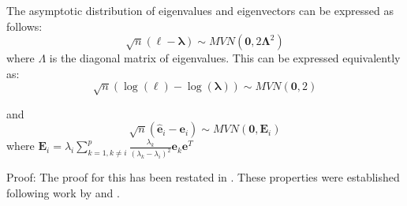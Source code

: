 \begin{theorem}
\label{th:pcasymptotics}
The asymptotic distribution of eigenvalues and eigenvectors can be expressed as follows:
\begin{equation}
\label{pcasymptotics}
\sqrt{n}(\boldsymbol{\ell} - \boldsymbol{\lambda}) \sim MVN(\boldsymbol{0}, 2\boldsymbol{\Lambda}^{2})
\end{equation}
where $\Lambda$ is the diagonal matrix of eigenvalues.   This can be expressed equivalently as:
\begin{equation}
\label{pcaasymptoticslog}
\sqrt{n}\left(\log(\boldsymbol{\ell}) - \log(\boldsymbol{\lambda})\right) \sim MVN(\boldsymbol{0}, 2)
\end{equation}

 and 
\begin{equation}
\sqrt{n}(\hat{\boldsymbol{e}}_{i} - \boldsymbol{e}_{i}) \sim MVN(\boldsymbol{0}, \boldsymbol{E}_{i})
\end{equation}
where $\boldsymbol{E}_{i} = \lambda_{i} \sum_{k = 1, k \neq i}^{p} \frac{\lambda_{k}}{(\lambda_{k} - \lambda_{i})^{2}} \boldsymbol{e}_{k}\boldsymbol{e}^{T}$
\end{theorem}
Proof: The proof for this has been restated in \cite{Flury:1988}.   These properties were established following work by \cite{Anderson:1963} and \cite{Girshink:1939}.
